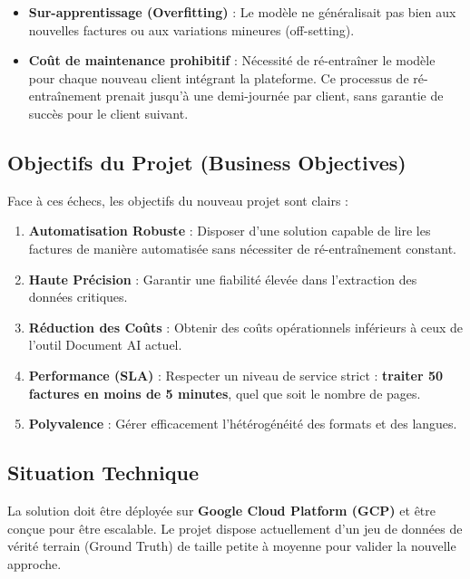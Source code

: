 \documentclass[
  letterpaper,
  DIV=11,
  numbers=noendperiod]{scrartcl}
\begin{document}
\begin{itemize}
\item
  \textbf{Sur-apprentissage (Overfitting)} : Le modèle ne généralisait
  pas bien aux nouvelles factures ou aux variations mineures
  (off-setting).
\item
  \textbf{Coût de maintenance prohibitif} : Nécessité de ré-entraîner le
  modèle pour chaque nouveau client intégrant la plateforme. Ce
  processus de ré-entraînement prenait jusqu'à une demi-journée par
  client, sans garantie de succès pour le client suivant.
\end{itemize}

\subsection{Objectifs du Projet (Business
Objectives)}\label{objectifs-du-projet-business-objectives}

Face à ces échecs, les objectifs du nouveau projet sont clairs :

\begin{enumerate}
\def\labelenumi{\arabic{enumi}.}
\item
  \textbf{Automatisation Robuste} : Disposer d'une solution capable de
  lire les factures de manière automatisée sans nécessiter de
  ré-entraînement constant.
\item
  \textbf{Haute Précision} : Garantir une fiabilité élevée dans
  l'extraction des données critiques.
\item
  \textbf{Réduction des Coûts} : Obtenir des coûts opérationnels
  inférieurs à ceux de l'outil Document AI actuel.
\item
  \textbf{Performance (SLA)} : Respecter un niveau de service strict :
  \textbf{traiter 50 factures en moins de 5 minutes}, quel que soit le
  nombre de pages.
\item
  \textbf{Polyvalence} : Gérer efficacement l'hétérogénéité des formats
  et des langues.
\end{enumerate}

\subsection{Situation Technique}\label{situation-technique}

La solution doit être déployée sur \textbf{Google Cloud Platform (GCP)}
et être conçue pour être escalable. Le projet dispose actuellement d'un
jeu de données de vérité terrain (Ground Truth) de taille petite à
moyenne pour valider la nouvelle approche.
\end{document}

